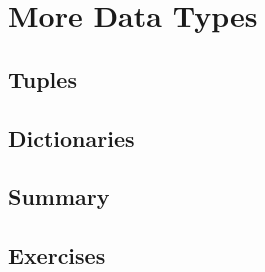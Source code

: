 \chapter{More Data Types}

\section{Tuples}


\section{Dictionaries}


\section{Summary}


\section{Exercises}

